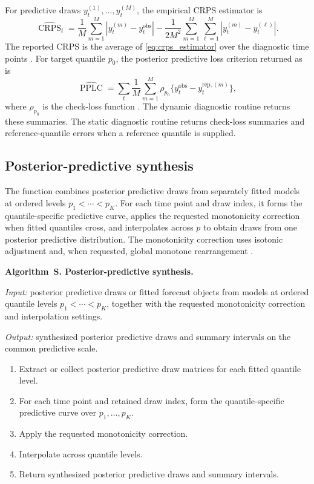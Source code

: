 \documentclass[nojss,noheadings]{jss}
\newcommand{\CRPS}{\operatorname{CRPS}}
\newcommand{\PPLC}{\operatorname{PPLC}}
\newcounter{suppalgorithm}
\renewcommand{\thesuppalgorithm}{S\arabic{suppalgorithm}}
\newenvironment{suppalgorithm}[1]{%
  \refstepcounter{suppalgorithm}%
  \par\medskip\noindent\textbf{Algorithm~\thesuppalgorithm. #1.}\par\nobreak
}{\par\medskip}
\begin{document}
For predictive draws $y_t^{(1)},\ldots,y_t^{(M)}$, the empirical CRPS estimator
is
\begin{equation}
\widehat{\CRPS}_t
=
\frac{1}{M}\sum_{m=1}^M |y_t^{(m)}-y_t^{\mathrm{obs}}|
-
\frac{1}{2M^2}\sum_{m=1}^M\sum_{\ell=1}^M
|y_t^{(m)}-y_t^{(\ell)}|.
\label{eq:crps_estimator}
\end{equation}
The reported CRPS is the average of \eqref{eq:crps_estimator} over the
diagnostic time points \citep{gneiting2007}. For target quantile $p_0$, the
posterior predictive loss criterion returned as  is
\begin{equation}
\widehat{\PPLC}
=
\sum_t
\frac{1}{M}\sum_{m=1}^M
\rho_{p_0}\{y_t^{\mathrm{obs}}-y_t^{\mathrm{rep},(m)}\},
\label{eq:pplc_estimator}
\end{equation}
where $\rho_{p_0}$ is the check-loss function \citep{gelfand1998model}.
The dynamic diagnostic routine returns these summaries. The static diagnostic
routine returns check-loss summaries and reference-quantile errors when a
reference quantile is supplied.

\subsection{Posterior-predictive synthesis}

The function  combines posterior predictive draws
from separately fitted models at ordered levels $p_1<\cdots<p_K$. For each time
point and draw index, it forms the quantile-specific predictive curve, applies
the requested monotonicity correction when fitted quantiles cross, and
interpolates across $p$ to obtain draws from one posterior predictive
distribution. The monotonicity correction uses isotonic adjustment and, when
requested, global monotone rearrangement \citep{barlow1972,chernozhukov2010}.

\begin{suppalgorithm}{Posterior-predictive synthesis}
\label{alg:predictive-synthesis}
\par\noindent\emph{Input:} posterior predictive draws or fitted forecast
objects from models at ordered quantile levels $p_1<\cdots<p_K$, together with
the requested monotonicity correction and interpolation settings.
\par\noindent\emph{Output:} synthesized posterior predictive draws and
summary intervals on the common predictive scale.
\begin{enumerate}[label=(\arabic*)]
\item Extract or collect posterior predictive draw matrices for each fitted
quantile level.
\item For each time point and retained draw index, form the quantile-specific
predictive curve over $p_1,\ldots,p_K$.
\item Apply the requested monotonicity correction.
\item Interpolate across quantile levels.
\item Return synthesized posterior predictive draws and summary intervals.
\end{enumerate}
\end{suppalgorithm}
\end{document}
